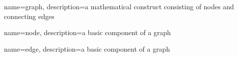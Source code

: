 
{
  name=graph,
  description={a mathematical construct consisting of nodes and connecting edges}
}

{
  name=node,
  description={a basic component of a graph}
}

{
  name=edge,
  description={a basic component of a graph}
}

